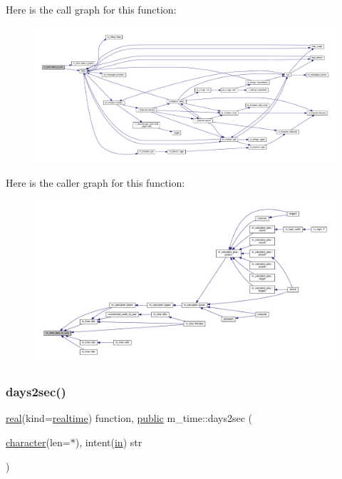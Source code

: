 Here is the call graph for this function\+:
\nopagebreak
\begin{figure}[H]
\begin{center}
\leavevmode
\includegraphics[width=350pt]{namespacem__time_aed245c691853279ebf0ce899dec9caa9_cgraph}
\end{center}
\end{figure}
Here is the caller graph for this function\+:
\nopagebreak
\begin{figure}[H]
\begin{center}
\leavevmode
\includegraphics[width=350pt]{namespacem__time_aed245c691853279ebf0ce899dec9caa9_icgraph}
\end{center}
\end{figure}
\mbox{\label{namespacem__time_a99393c7906f1989f90ece03969224938}} 
\subsubsection{\texorpdfstring{days2sec()}{days2sec()}}
{\footnotesize\ttfamily \hyperlink{read__watch_83_8txt_abdb62bde002f38ef75f810d3a905a823}{real}(kind=\hyperlink{namespacem__time_ac10ea9e8d59ec74eaa7d89f2517d7422}{realtime}) function, \hyperlink{M__stopwatch_83_8txt_a2f74811300c361e53b430611a7d1769f}{public} m\+\_\+time\+::days2sec (\begin{DoxyParamCaption}\item[{\hyperlink{option__stopwatch_83_8txt_abd4b21fbbd175834027b5224bfe97e66}{character}(len=$\ast$), intent(\hyperlink{M__journal_83_8txt_afce72651d1eed785a2132bee863b2f38}{in})}]{str }\end{DoxyParamCaption})}



